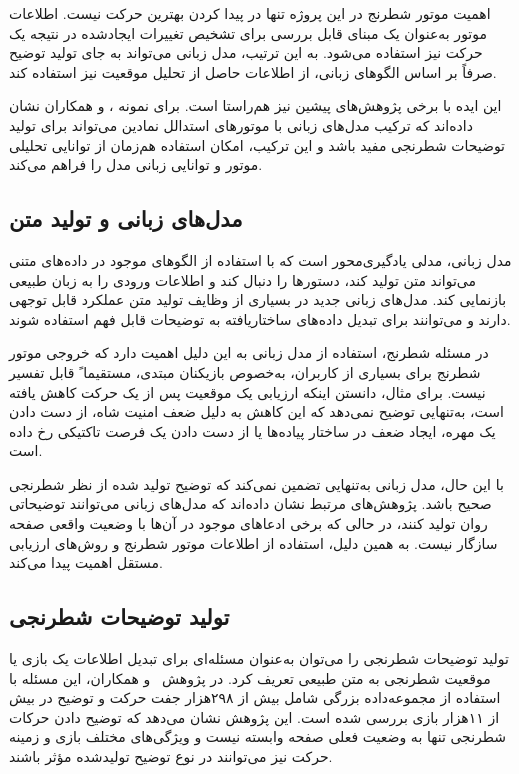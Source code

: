 اهمیت موتور شطرنج در این پروژه تنها در پیدا کردن بهترین حرکت نیست. اطلاعات موتور به‌عنوان یک مبنای قابل بررسی برای تشخیص تغییرات ایجادشده در نتیجه یک حرکت نیز استفاده می‌شود. به این ترتیب، مدل زبانی می‌تواند به جای تولید توضیح صرفاً بر اساس الگوهای زبانی، از اطلاعات حاصل از تحلیل موقعیت نیز استفاده کند.

این ایده با برخی پژوهش‌های پیشین نیز هم‌راستا است. برای نمونه ، و همکاران نشان داده‌اند که ترکیب مدل‌های زبانی با موتورهای استدالل نمادین می‌تواند برای تولید توضیحات شطرنجی مفید باشد و این ترکیب، امکان استفاده هم‌زمان از توانایی تحلیلی موتور و توانایی زبانی مدل را فراهم می‌کند.

\subsection{مدل‌های زبانی و تولید متن}

مدل زبانی، مدلی یادگیری‌محور است که با استفاده از الگوهای موجود در داده‌های متنی می‌تواند متن تولید کند، دستورها را دنبال کند و اطلاعات ورودی را به زبان طبیعی بازنمایی کند. مدل‌های زبانی جدید در بسیاری از وظایف تولید متن عملکرد قابل توجهی دارند و می‌توانند برای تبدیل داده‌های ساختاریافته به توضیحات قابل فهم استفاده شوند.

در مسئله شطرنج، استفاده از مدل زبانی به این دلیل اهمیت دارد که خروجی موتور شطرنج برای بسیاری از کاربران، به‌خصوص بازیکنان مبتدی، مستقیما ً قابل تفسیر نیست. برای مثال، دانستن اینکه ارزیابی یک موقعیت پس از یک حرکت کاهش یافته است، به‌تنهایی توضیح نمی‌دهد که این کاهش به دلیل ضعف امنیت شاه، از دست دادن یک مهره، ایجاد ضعف در ساختار پیاده‌ها یا از دست دادن یک فرصت تاکتیکی رخ داده است.

با این حال، مدل زبانی به‌تنهایی تضمین نمی‌کند که توضیح تولید شده از نظر شطرنجی صحیح باشد. پژوهش‌های مرتبط نشان داده‌اند که مدل‌های زبانی می‌توانند توضیحاتی روان تولید کنند، در حالی که برخی ادعاهای موجود در آن‌ها با وضعیت واقعی صفحه سازگار نیست. به همین دلیل، استفاده از اطلاعات موتور شطرنج و روش‌های ارزیابی مستقل اهمیت پیدا می‌کند.

\subsection{تولید توضیحات شطرنجی}

تولید توضیحات شطرنجی را می‌توان به‌عنوان مسئله‌ای برای تبدیل اطلاعات یک بازی یا موقعیت شطرنجی به متن طبیعی تعریف کرد. در پژوهش  ~\cite{jhamtani2018}و همکاران، این مسئله با استفاده از مجموعه‌داده بزرگی شامل بیش از  ۲۹۸هزار جفت حرکت و توضیح در بیش از  ۱۱هزار بازی بررسی شده است. این پژوهش نشان می‌دهد که توضیح دادن حرکات شطرنجی تنها به وضعیت فعلی صفحه وابسته نیست و ویژگی‌های مختلف بازی و زمینه حرکت نیز می‌توانند در نوع توضیح تولیدشده مؤثر باشند.

